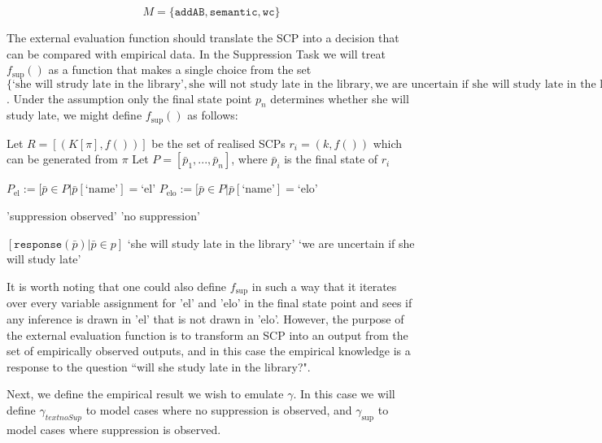 \[
M=\{\texttt{addAB}, \texttt{semantic}, \texttt{wc}\}
\]

The external evaluation function should translate the SCP into a decision that can be compared with empirical data. In the Suppression Task we will treat $f_\text{sup}()$ as a function that makes a single choice from the set $\{\text{`she will strudy late in the library'},\text{she will not study late in the library}, \text{we are uncertain if she will study late in the library}\}$. Under the assumption only the final state point $p_n$
determines whether she will study late, we might define $f_\text{sup}()$ as follows:

\begin{algorithm}[H] \label{evaluation:f_sup}
\SetAlgoLined
{}
{
Let $R=[(K[\pi],f())]$ be the set of realised SCPs $r_i=(k,f())$ which can be generated from $\pi$\;
Let $P=[\bar{p}_1,...,\bar{p}_n]$, where $\bar{p}_i$ is the final state of $r_i$\;

$P_\text{el}:=[\bar{p} \in P | \bar{p}[\text{`name'}]=\text{`el'}$\;
$P_\text{elo}:=[\bar{p} \in P | \bar{p}[\text{`name'}]=\text{`elo'}$\;

{
\Return 'suppression observed'
}
\Else
{
\Return 'no suppression'
}
}
{
\Return $[\texttt{response}(\bar{p}) | \bar{p} \in p]$
}
{
{
\Return `she will study late in the library'
}
{
}
\Else
{
\Return `we are uncertain if she will study late'
}
}

\caption{$\texttt{f}_\text{sup}$}
\end{algorithm}

It is worth noting that one could also define $f_\text{sup}$ in such a way that it iterates over every variable assignment for 'el' and 'elo' in the final state point and sees if any inference is drawn in 'el' that is not drawn in 'elo'. However, the purpose of the external evaluation function is to transform an SCP into an output from the set of empirically observed outputs, and in this case the empirical knowledge is a response to the question ``will she study late in the library?".

Next, we define the empirical result we wish to emulate $\gamma$. In this case we will define $\gamma_{text{noSup}}$ to model cases where no suppression is observed, and $\gamma_{\text{sup}}$ to model cases where suppression is observed.

